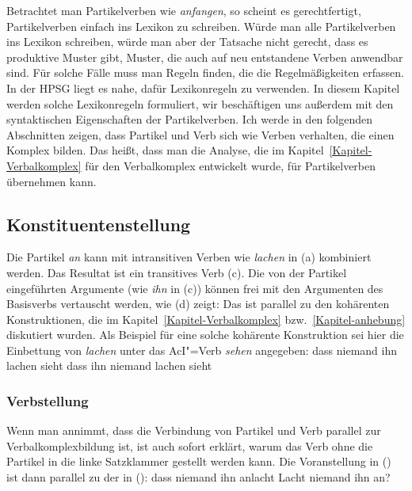 Betrachtet man Partikelverben wie \emph{anfangen}, so scheint es gerechtfertigt, Partikelverben einfach
ins Lexikon zu schreiben. Würde man alle Partikelverben ins Lexikon schreiben, würde man aber der Tatsache
nicht gerecht, dass es produktive Muster gibt, \dash Muster, die auch auf neu entstandene Verben anwendbar
sind. Für solche Fälle muss man Regeln finden, die die Regelmäßigkeiten erfassen. In der HPSG liegt
es nahe, dafür Lexikonregeln zu verwenden. In diesem Kapitel werden solche Lexikonregeln formuliert,
wir beschäftigen uns außerdem mit den syntaktischen Eigenschaften der Partikelverben.
Ich werde in den folgenden Abschnitten zeigen, dass Partikel und Verb sich wie Verben verhalten,
die einen Komplex bilden. Das heißt, dass man die Analyse, die im Kapitel~\ref{Kapitel-Verbalkomplex}
für den Verbalkomplex entwickelt wurde, für Partikelverben übernehmen kann.

\subsection{Konstituentenstellung}
\label{sec-linearization}%
\label{sec-partlinearization}
\label{sec-linearization-pv-mf}


Die Partikel \emph{an} kann mit intransitiven Verben
wie \emph{lachen} in (a) kombiniert werden. Das Resultat ist ein transitives Verb (c).
Die von der Partikel eingeführten Argumente (wie \zb \emph{ihn} in (c)) können frei
mit den Argumenten des Basisverbs vertauscht werden, wie (d) zeigt:
\eal
\label{ex-anlachen-perm-mf}
\zl
Das ist parallel zu den kohärenten Konstruktionen, die im Kapitel~\ref{Kapitel-Verbalkomplex}
bzw.~\ref{Kapitel-anhebung} diskutiert wurden. Als Beispiel für eine solche kohärente Konstruktion
sei hier die Einbettung von \emph{lachen} unter das AcI"=Verb \emph{sehen} angegeben:
\eal
\ex dass niemand ihn lachen sieht
\ex dass ihn niemand lachen sieht
\zl


\subsubsection{Verbstellung}

Wenn man annimmt, dass die Verbindung von Partikel und Verb parallel zur Verbalkomplexbildung 
ist, ist auch sofort erklärt, warum das Verb ohne die Partikel in die linke Satzklammer gestellt werden kann. Die Voranstellung
in () ist dann parallel zu der in ():
\eal
\ex dass niemand ihn anlacht
\ex Lacht niemand ihn an?
\zl


